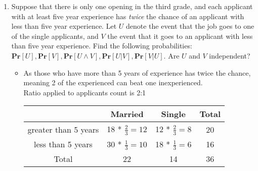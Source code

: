 \documentclass[11pt]{article}
\renewcommand{\Pr}{\ensuremath{\mathbf{Pr}}\xspace}
\begin{document}
\begin{description}
\begin{enumerate}
\begin{enumerate}
 \item
Suppose that there is only one opening in the third grade, and each applicant with at least five year experience has \emph{twice} the chance of an applicant with less than five year experience.  Let $U$ denote the event that the job goes to one of the single applicants, and $V$ the event that it goes to an applicant with less than five year experience.  Find the following probabilities: $\Pr[U], \Pr[V], \Pr[U \wedge V], \Pr[U|V], \Pr[V|U]$.  Are $U$ and $V$ independent?
	\begin{itemize}
	\item
	As those who have more than 5 years of experience has twice the chance, meaning 2 of the experienced can beat one inexperienced.\\
	Ratio applied to applicants count is 2:1\\
	\begin{center}
		\begin{tabular}{|c|c|c|c|} \hline
		& Married & Single & Total
		\\ \hline
		greater than 5 years & 18 * $\frac{2}{3} = 12 $ & 12 * $\frac{2}{3} = 8 $ & 20
		\\ \hline
		less than 5 years & 30 * $\frac{1}{3} = 10 $ & 18 * $\frac{1}{3} = 6 $ & 16
		\\ \hline
		Total & 22 & 14 & 36
		\\ \hline
		\end{tabular}
	\end{center}


\end{itemize}
\end{enumerate}
\end{enumerate}
\end{description}
\end{document}
